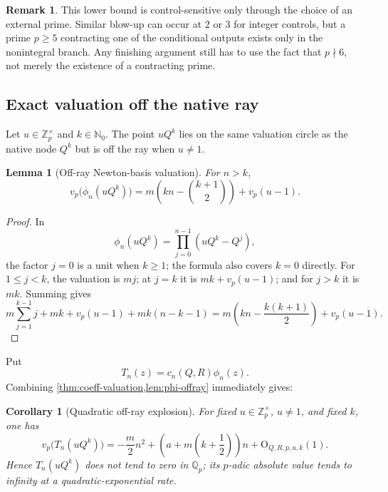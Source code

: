 \documentclass[11pt,oneside]{article}
\newtheorem{lemma}[theorem]{Lemma}
\newtheorem{corollary}[theorem]{Corollary}
\theoremstyle{definition}
\newtheorem{remark}[theorem]{Remark}
\newcommand{\Nzero}{\mathbb N_0}
\newcommand{\Z}{\mathbb Z}
\newcommand{\Qp}{\mathbb Q_p}
\newcommand{\vp}{v_p}
\newcommand{\bigO}{\mathrm O}
\begin{document}
\begin{remark}
This lower bound is control-sensitive only through the choice of an external prime.  Similar
blow-up can occur at $2$ or $3$ for integer controls, but a prime $p\ge5$ contracting one of
the conditional outputs exists only in the nonintegral branch.  Any finishing argument still
has to use the fact that $p\nmid6$, not merely the existence of a contracting prime.
\end{remark}

\subsection{Exact valuation off the native ray}

Let $u\in\Z_p^\times$ and $k\in\Nzero$.  The point $uQ^k$ lies on the same valuation circle
as the native node $Q^k$ but is off the ray when $u\ne1$.

\begin{lemma}[Off-ray Newton-basis valuation]\label{lem:phi-offray}
For $n>k$,
\begin{equation}\label{eq:phi-offray}
 \vp\bigl(\phi_n(uQ^k)\bigr)
 =m\left(kn-\binom{k+1}{2}\right)+\vp(u-1).
\end{equation}
\end{lemma}

\begin{proof}
In
\[
 \phi_n(uQ^k)=\prod_{j=0}^{n-1}(uQ^k-Q^j),
\]
the factor $j=0$ is a unit when $k\ge1$; the formula also covers $k=0$ directly.  For
$1\le j<k$, the valuation is $mj$; at $j=k$ it is $mk+\vp(u-1)$; and for $j>k$ it is
$mk$.  Summing gives
\[
 m\sum_{j=1}^{k-1}j+mk+\vp(u-1)+mk(n-k-1)
 =m\left(kn-\frac{k(k+1)}2\right)+\vp(u-1).
\]
\end{proof}

Put
\begin{equation}\label{eq:Tn}
 T_n(z)=c_n(Q,R)\phi_n(z).
\end{equation}
Combining \cref{thm:coeff-valuation,lem:phi-offray} immediately gives:

\begin{corollary}[Quadratic off-ray explosion]\label{cor:term-explosion}
For fixed $u\in\Z_p^\times$, $u\ne1$, and fixed $k$, one has
\begin{equation}\label{eq:Tn-asymptotic}
 \vp\bigl(T_n(uQ^k)\bigr)
 =-\frac m2n^2+
 \left(a+m\left(k+\frac12\right)\right)n
 +\bigO_{Q,R,p,u,k}(1).
\end{equation}
Hence $T_n(uQ^k)$ does not tend to zero in $\Qp$; its $p$-adic absolute value tends to
infinity at a quadratic-exponential rate.
\end{corollary}
\end{document}

